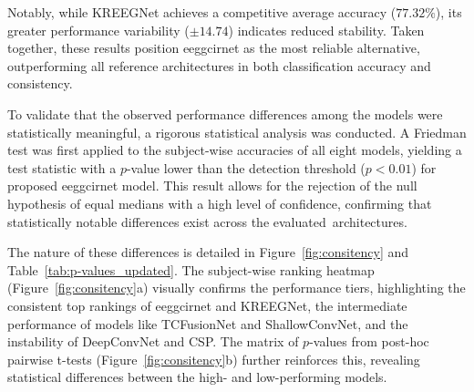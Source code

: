 Notably, while KREEGNet achieves a competitive average accuracy ($77.32\%$), its greater performance variability ($\pm 14.74$) indicates reduced stability. Taken together, these results position \gls{eeggcirnet} as the most reliable alternative, outperforming all reference architectures in both classification accuracy and consistency.

{To validate that the observed performance differences among the models were statistically meaningful, a rigorous statistical analysis was conducted. A Friedman test was first applied to the subject-wise accuracies of all eight models, yielding a test statistic with a $p$-value lower than the detection threshold ($p < 0.01$) for proposed \gls{eeggcirnet} model. This result allows for the rejection of the null hypothesis of equal medians with a high level of confidence, confirming that statistically notable differences exist across the \mbox{evaluated architectures.}}

{The nature of these differences is detailed in Figure~\ref{fig:consitency} and Table~\ref{tab:p-values_updated}. The subject-wise ranking heatmap (Figure~\ref{fig:consitency}a) visually confirms the performance tiers, highlighting the consistent top rankings of \gls{eeggcirnet} and KREEGNet, the intermediate performance of models like TCFusionNet and ShallowConvNet, and the instability of DeepConvNet and CSP. The matrix of $p$-values from post-hoc pairwise t-tests (Figure~\ref{fig:consitency}b) further reinforces this, revealing statistical differences between the high- and low-performing models.}

